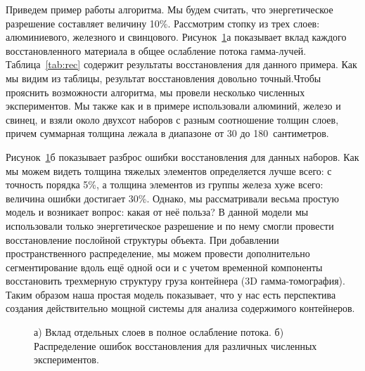 Приведем пример работы алгоритма. Мы будем считать, что энергетическое разрешение составляет величину 10\%. Рассмотрим стопку из трех слоев: алюминиевого, железного и свинцового. Рисунок~\ref{rec:ex}а показывает вклад каждого восстановленного материала в общее ослабление потока гамма-лучей. Таблица~\ref{tab:rec} содержит результаты восстановления для данного примера. Как мы видим из таблицы, результат восстановления довольно точный.Чтобы прояснить возможности алгоритма, мы провели несколько численных экспериментов. Мы также как и в примере использовали алюминий, железо и свинец, и взяли около двухсот наборов с разным соотношение толщин слоев, причем суммарная толщина лежала в диапазоне от 30 до 180~сантиметров.
\begin{figure}[ht] 
\end{figure}
Рисунок~\ref{rec:ex}б показывает разброс ошибки восстановления для данных наборов. Как мы можем видеть толщина тяжелых элементов определяется лучше всего: с точность порядка 5\%, а толщина элементов из группы железа хуже всего: величина ошибки достигает 30\%. Однако, мы рассматривали весьма простую модель и возникает вопрос: какая от неё польза? В данной модели мы использовали только энергетическое разрешение и по нему смогли провести восстановление послойной структуры объекта. При добавлении пространственного распределение, мы можем провести дополнительно сегментирование вдоль ещё одной оси и с учетом временной компоненты восстановить трехмерную структуру груза контейнера (3D гамма-томография). Таким образом наша простая модель показывает, что у нас есть перспектива создания действительно мощной системы для анализа содержимого контейнеров.

\begin{figure}[t]
    \begin{center}
        \begin{minipage}[h]{0.49\linewidth}
        \end{minipage}
        \hfill
        \begin{minipage}[h]{0.49\linewidth}
        \end{minipage}
        \caption{а) Вклад отдельных слоев в полное ослабление потока. б) Распределение ошибок восстановления для различных численных экспериментов.}
    \end{center}
    \label{rec:ex}
\end{figure}


